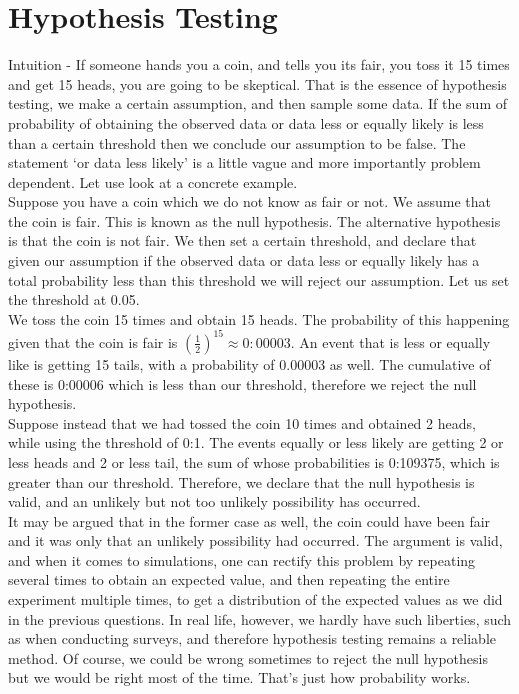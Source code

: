 \documentclass[answers]{exam}
\begin{document}
\section{Hypothesis Testing} Intuition - If someone hands you a coin, and tells you its fair, you toss it 15 times and get 15 heads, you are going to be skeptical. That is the essence of hypothesis testing, we make a certain assumption, and then sample some data. If the sum of probability of obtaining the observed data or data less or equally likely is less than a certain threshold then we conclude our assumption to be false. The statement `or data less likely' is a little vague and more importantly problem dependent. Let use look at a concrete example.\\

Suppose you have a coin which we do not know as fair or not. We assume that the coin is fair. This is known as the null hypothesis. The alternative hypothesis is that the coin is not fair. We then set a certain threshold, and declare that given our assumption if the observed data or data less or equally likely has a total probability less than this threshold we will reject our assumption. Let us set the threshold at 0.05.\\

We toss the coin 15 times and obtain 15 heads. The probability of this happening given that the
coin is fair is $(\frac{1}{2})^{15} \approx 0:00003$. An event that is less or equally like is getting 15 tails, with a probability of 0.00003 as well. The cumulative of these is 0:00006 which is less than our threshold, therefore we reject the null hypothesis.\\

Suppose instead that we had tossed the coin 10 times and obtained 2 heads, while using the threshold of 0:1. The events equally or less likely are getting 2 or less heads and 2 or less tail, the sum of whose probabilities is 0:109375, which is greater than our threshold. Therefore, we declare that the null hypothesis is valid, and an unlikely but not too unlikely possibility has occurred. \\

It may be argued that in the former case as well, the coin could have been fair and it was only that an unlikely possibility had occurred. The argument is valid, and when it comes to simulations, one can rectify this problem by repeating several times to obtain an expected value, and then repeating the
entire experiment multiple times, to get a distribution of the expected values as we did in the previous questions. In real life, however, we hardly have such liberties, such as when conducting surveys, and therefore hypothesis testing remains a reliable method. Of course, we could be wrong sometimes to reject the null hypothesis but we would be right most of the time. That's just how probability works. 
\end{document}

